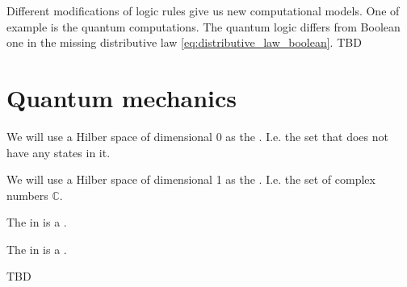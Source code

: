 Different modifications of logic rules give us new computational
models. One of example is the quantum computations. The quantum logic
differs from Boolean one in the missing distributive law
\eqref{eq:distributive_law_boolean}. 
TBD

\section{Quantum mechanics}
\begin{example}
\label{ex:quant_initial_object}
We will use a Hilber space of dimensional 0 as the
. I.e. the set that does not have any
states in it.
\end{example}

\begin{example}
  \label{ex:quant_terminal_object}
We will use a Hilber space of dimensional 1 as the
. I.e. the set of complex numbers
$\mathbb{C}$.   
\end{example}

\begin{example}
  \label{ex:quant_product}
  The  in  is a
  .
\end{example}

\begin{example}
  \label{ex:quant_sum}
  The  in  is a
  .
\end{example}

TBD

